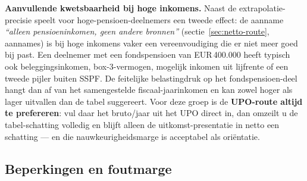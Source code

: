 \documentclass[11pt,a4paper]{article}
\begin{document}
\textbf{Aanvullende kwetsbaarheid bij hoge inkomens.} Naast de extrapolatie-precisie speelt voor hoge-pensioen-deelnemers een tweede effect: de aanname \emph{``alleen pensioeninkomen, geen andere bronnen''} (sectie~\ref{sec:netto-route}, aannames) is bij hoge inkomens vaker een vereenvoudiging die er niet meer goed bij past. Een deelnemer met een fondspensioen van EUR\,400.000 heeft typisch ook beleggingsinkomen, box-3-vermogen, mogelijk inkomen uit lijfrente of een tweede pijler buiten SSPF. De feitelijke belastingdruk op het fondspensioen-deel hangt dan af van het samengestelde fiscaal-jaarinkomen en kan zowel hoger als lager uitvallen dan de tabel suggereert. Voor deze groep is de \textbf{UPO-route altijd te prefereren}: vul daar het bruto/jaar uit het UPO direct in, dan omzeilt u de tabel-schatting volledig en blijft alleen de uitkomst-presentatie in netto een schatting --- en die nauwkeurigheidsmarge is acceptabel als oriëntatie.

\subsection{Beperkingen en foutmarge}
\end{document}
